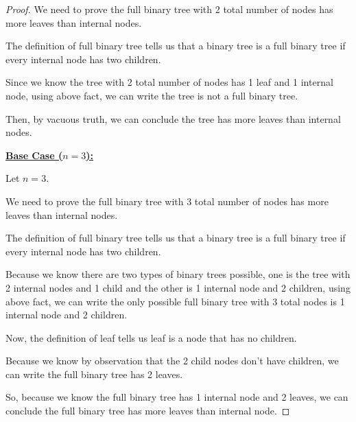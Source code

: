 \documentclass[12pt]{article}
\begin{document}
\begin{itemize}
\begin{proof}
    \bigskip

    We need to prove the full binary tree with 2 total number of nodes
    has more leaves than internal nodes.

    \bigskip

    The definition of full binary tree tells us that a binary tree is a full
    binary tree if every internal node has two children.

    \bigskip

    Since we know the tree with 2 total number of nodes
    has 1 leaf and 1 internal node, using above fact, we can write the
    tree is not a full binary tree.

    \bigskip

    Then, by vacuous truth, we can conclude the tree has more leaves than
    internal nodes.

    \bigskip

    \underline{\textbf{Base Case ($n = 3$):}}

    \bigskip

    Let $n = 3$.

    \bigskip

    We need to prove the full binary tree with 3 total number of nodes
    has more leaves than internal nodes.

    \bigskip

    The definition of full binary tree tells us that a binary tree is a full
    binary tree if every internal node has two children.

    \bigskip

    Because we know there are two types of binary trees possible,
    one is the tree with 2 internal nodes and 1 child and the other
    is 1 internal node and 2 children, using above fact, we can write
    the only possible full binary tree with 3 total nodes is 1 internal
    node and 2 children.

    \bigskip

    Now, the definition of leaf tells us leaf is a node that has no children.

    \bigskip

    Because we know by observation that the 2 child nodes don't
    have children, we can write the full binary tree has 2 leaves.

    \bigskip

    So, because we know the full binary tree has 1 internal node
    and 2 leaves, we can conclude the full binary tree has more
    leaves than internal node.


\end{proof}
\end{itemize}
\end{document}

